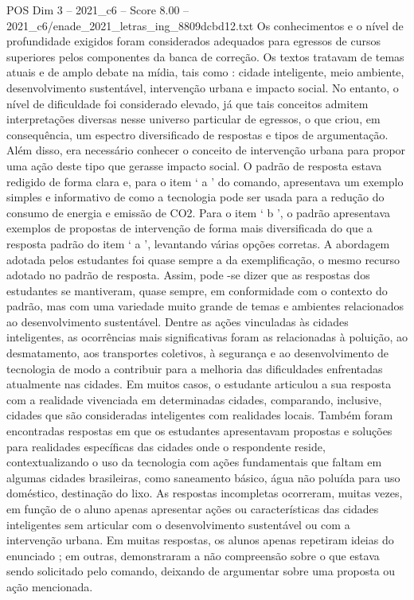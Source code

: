 \begin{textsample}{POS Dim 3 – 2021\_c6 – Score 8.00 – 2021\_c6/enade\_2021\_letras\_ing\_8809dcbd12.txt}
Os conhecimentos e o nível de profundidade exigidos foram considerados adequados para egressos de cursos superiores pelos componentes da banca de correção.
Os textos tratavam de temas atuais e de amplo debate na mídia, tais como : cidade inteligente, meio ambiente, desenvolvimento sustentável, intervenção urbana e impacto social.
No entanto, o nível de dificuldade foi considerado elevado, já que tais conceitos admitem interpretações diversas nesse universo particular de egressos, o que criou, em consequência, um espectro diversificado de respostas e tipos de argumentação.
Além disso, era necessário conhecer o conceito de intervenção urbana para propor uma ação deste tipo que gerasse impacto social.
O padrão de resposta estava redigido de forma clara e, para o item ‘ a ’ do comando, apresentava um exemplo simples e informativo de como a tecnologia pode ser usada para a redução do consumo de energia e emissão de CO2.
Para o item ‘ b ’, o padrão apresentava exemplos de propostas de intervenção de forma mais diversificada do que a resposta padrão do item ‘ a ’, levantando várias opções corretas.
A abordagem adotada pelos estudantes foi quase sempre a da exemplificação, o mesmo recurso adotado no padrão de resposta.
Assim, pode -se dizer que as respostas dos estudantes se mantiveram, quase sempre, em conformidade com o contexto do padrão, mas com uma variedade muito grande de temas e ambientes relacionados ao desenvolvimento sustentável.
Dentre as ações vinculadas às cidades inteligentes, as ocorrências mais significativas foram as relacionadas à poluição, ao desmatamento, aos transportes coletivos, à segurança e ao desenvolvimento de tecnologia de modo a contribuir para a melhoria das dificuldades enfrentadas atualmente nas cidades.
Em muitos casos, o estudante articulou a sua resposta com a realidade vivenciada em determinadas cidades, comparando, inclusive, cidades que são consideradas inteligentes com realidades locais.
Também foram encontradas respostas em que os estudantes apresentavam propostas e soluções para realidades específicas das cidades onde o respondente reside, contextualizando o uso da tecnologia com ações fundamentais que faltam em algumas cidades brasileiras, como saneamento básico, água não poluída para uso doméstico, destinação do lixo.
As respostas incompletas ocorreram, muitas vezes, em função de o aluno apenas apresentar ações ou características das cidades inteligentes sem articular com o desenvolvimento sustentável ou com a intervenção urbana.
Em muitas respostas, os alunos apenas repetiram ideias do enunciado ; em outras, demonstraram a não compreensão sobre o que estava sendo solicitado pelo comando, deixando de argumentar sobre uma proposta ou ação mencionada.

\end{textsample}

